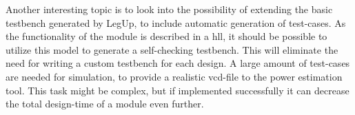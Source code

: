 Another interesting topic is to look into the possibility of extending the basic testbench generated by LegUp, to include automatic generation of test-cases. As the functionality of the module is described in a \gls{hll}, it should be possible to utilize this model to generate a self-checking testbench. This will eliminate the need for writing a custom testbench for each design. A large amount of test-cases are needed for simulation, to provide a realistic \gls{vcd}-file to the power estimation tool. This task might be complex, but if implemented successfully it can decrease the total design-time of a module even further.